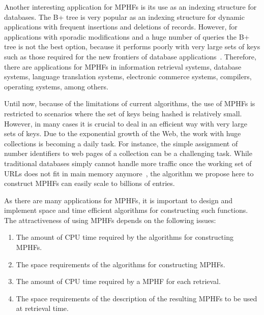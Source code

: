  Another interesting application for MPHFs is its use as an indexing structure 
 for databases. 
 The B+ tree is very popular as an indexing structure for dynamic applications 
 with frequent insertions and deletions of records. 
 However, for applications with sporadic modifications and a huge number of 
 queries the B+ tree is not the best option, 
 because it performs poorly with very large sets of keys 
 such as those required for the new frontiers of database applications~\cite{s05}.
 Therefore, there are applications for MPHFs in 
 information retrieval systems, database systems, language translation systems, 
 electronic commerce systems, compilers, operating systems, among others.

Until now, because of the limitations of current algorithms,
the use of MPHFs is restricted to scenarios where the set of keys being hashed is 
relatively small.
However, in many cases it is crucial to deal in an efficient way with very large
sets of keys. 
Due to the exponential growth of the Web, the work with huge collections is becoming
a daily task. 
For instance, the simple assignment of number identifiers to web pages of a collection 
can be a challenging task. 
While traditional databases simply cannot handle more traffic once the working 
set of URLs does not fit in main memory anymore~\cite{s05}, the algorithm we propose here to
construct MPHFs can easily scale to billions of entries.

As there are many applications for MPHFs, it is 
important to design and implement space and time efficient algorithms for 
constructing such functions. 
The attractiveness of using MPHFs depends on the following issues:
\begin{enumerate}
\item The amount of CPU time required by the algorithms for constructing MPHFs.
\item The space requirements of the algorithms for constructing MPHFs.
\item The amount of CPU time required by a MPHF for each retrieval.
\item The space requirements of the description of the resulting MPHFs to be
  used at retrieval time.
\end{enumerate}

